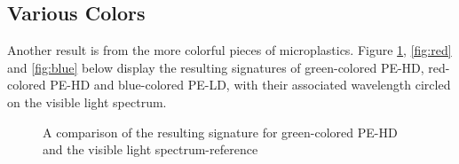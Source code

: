 \subsection{Various Colors}
Another result is from the more colorful pieces of microplastics. Figure \ref{fig:green}, \ref{fig:red} and \ref{fig:blue} below display the resulting signatures of green-colored PE-HD, red-colored PE-HD and blue-colored PE-LD, with their associated wavelength circled on the visible light spectrum.  
\begin{figure}[H]
  \newcommand*\FigVSkip{0.5em}
  \newcommand*\FigHSkip{0.1em}
  \newsavebox\FigBox
  \centering
  \begin{minipage}{\wd\FigBox}
    \centering\usebox{\FigBox}
  \end{minipage}
  \begin{minipage}{\wd\FigBox}
    \centering\usebox{\FigBox}
  \end{minipage}
  \caption{A comparison of the resulting signature for green-colored PE-HD and the visible light spectrum-reference}
  \label{fig:green}
\end{figure}

